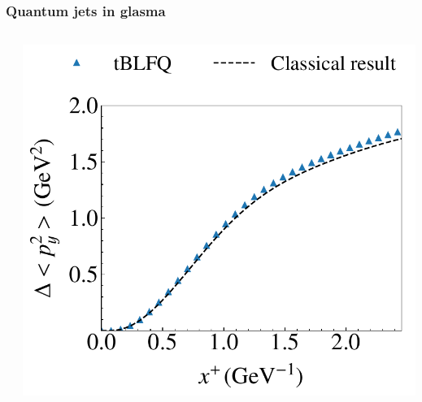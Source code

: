 \documentclass[aspectratio=169,11pt,usenames,dvipsnames]{beamer}
\begin{document}
\begin{frame}[noframenumbering]
    \frametitle{Quantum jets in glasma}
    \vspace{-15pt}
    \begin{center}
        \begin{columns}[onlytextwidth,t]
           \begin{center}
                
            \end{center}

            \begin{center}
                \includegraphics[width=0.88\columnwidth]{images/quantummombroad.pdf}
            \end{center}


\end{columns}
\end{center}
\end{frame}
\end{document}

